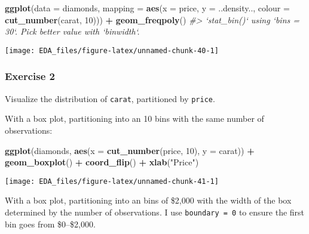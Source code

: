 \documentclass[]{book}
\newenvironment{Shaded}{\begin{snugshade}}{\end{snugshade}}
\newcommand{\CommentTok}[1]{\textcolor[rgb]{0.56,0.35,0.01}{\textit{#1}}}
\newcommand{\DataTypeTok}[1]{\textcolor[rgb]{0.13,0.29,0.53}{#1}}
\newcommand{\DecValTok}[1]{\textcolor[rgb]{0.00,0.00,0.81}{#1}}
\newcommand{\KeywordTok}[1]{\textcolor[rgb]{0.13,0.29,0.53}{\textbf{#1}}}
\newcommand{\NormalTok}[1]{#1}
\newcommand{\OperatorTok}[1]{\textcolor[rgb]{0.81,0.36,0.00}{\textbf{#1}}}
\newcommand{\StringTok}[1]{\textcolor[rgb]{0.31,0.60,0.02}{#1}}
\theoremstyle{plain}
\theoremstyle{remark}
\theoremstyle{definition}
\theoremstyle{definition}
\theoremstyle{definition}
\theoremstyle{remark}
\begin{document}
\begin{Shaded}
\begin{Highlighting}[]
\KeywordTok{ggplot}\NormalTok{(}\DataTypeTok{data =}\NormalTok{ diamonds,}
       \DataTypeTok{mapping =} \KeywordTok{aes}\NormalTok{(}\DataTypeTok{x =}\NormalTok{ price,}
                     \DataTypeTok{y =}\NormalTok{ ..density..,}
                     \DataTypeTok{colour =} \KeywordTok{cut_number}\NormalTok{(carat, }\DecValTok{10}\NormalTok{))) }\OperatorTok{+}
\StringTok{  }\KeywordTok{geom_freqpoly}\NormalTok{()}
\CommentTok{#> `stat_bin()` using `bins = 30`. Pick better value with `binwidth`.}
\end{Highlighting}
\end{Shaded}

\begin{center}\texttt{[image: EDA\_files/figure-latex/unnamed-chunk-40-1]} \end{center}

\hypertarget{exercise-2-16}{%
\subsubsection{Exercise 2}\label{exercise-2-16}}

Visualize the distribution of \texttt{carat}, partitioned by
\texttt{price}.

With a box plot, partitioning into an 10 bins with the same number of
observations:

\begin{Shaded}
\begin{Highlighting}[]
\KeywordTok{ggplot}\NormalTok{(diamonds, }\KeywordTok{aes}\NormalTok{(}\DataTypeTok{x =} \KeywordTok{cut_number}\NormalTok{(price, }\DecValTok{10}\NormalTok{), }\DataTypeTok{y =}\NormalTok{ carat)) }\OperatorTok{+}
\StringTok{  }\KeywordTok{geom_boxplot}\NormalTok{() }\OperatorTok{+}
\StringTok{  }\KeywordTok{coord_flip}\NormalTok{() }\OperatorTok{+}
\StringTok{  }\KeywordTok{xlab}\NormalTok{(}\StringTok{"Price"}\NormalTok{)}
\end{Highlighting}
\end{Shaded}

\begin{center}\texttt{[image: EDA\_files/figure-latex/unnamed-chunk-41-1]} \end{center}

With a box plot, partitioning into an bins of \$2,000 with the width of
the box determined by the number of observations. I use
\texttt{boundary\ =\ 0} to ensure the first bin goes from \$0--\$2,000.
\end{document}

